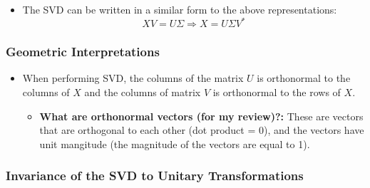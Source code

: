 \documentclass[11.5pt,a4paper]{article}
\begin{document}
\begin{itemize}
\begin{itemize}
        \begin{equation*}
            XV = V\Lambda \Rightarrow X = V\Lambda V^{*}
        \end{equation*}
        \textit{Here, matrix $V$ is a unitary matrix, therefore $V^{-1} = V^*$}
        \item The SVD can be written in a similar form to the above representations:
        \begin{equation*}
            XV = U\Sigma \Rightarrow X = U\Sigma V^*
        \end{equation*}
    \end{itemize}
\end{itemize}

\subsubsection*{Geometric Interpretations}

\begin{itemize}
    \item When performing SVD, the columns of the matrix $U$ is orthonormal to the columns of $X$ and the columns of matrix $V$ is orthonormal to the rows of $X$. 
    \begin{itemize}
        \item \textbf{What are orthonormal vectors (for my review)?:} These are vectors that are orthogonal to each other (dot product = 0), and the vectors have unit mangitude (the magnitude of the vectors are equal to 1).
    \end{itemize}
\end{itemize}

\subsubsection*{Invariance of the SVD to Unitary Transformations}
\end{document}
